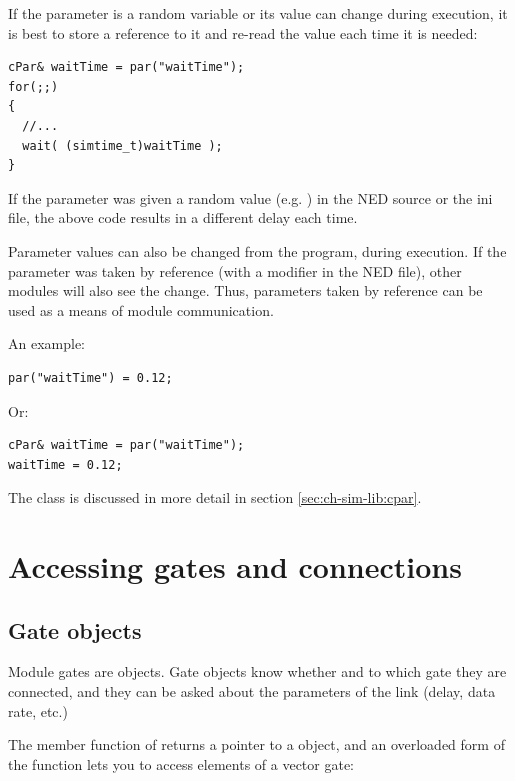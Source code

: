 If the parameter is a random variable or its value can change
during execution, it is best to store a reference to it and re-read
the value each time it is needed:

\begin{verbatim}
cPar& waitTime = par("waitTime");
for(;;)
{
  //...
  wait( (simtime_t)waitTime );
}
\end{verbatim}

If the  parameter was given a random value (e.g. )
in the NED source or the ini file, the above code results in
a different delay each time.

Parameter values can also be changed from the program, during
execution. If the parameter was taken by reference
 (with a
 modifier in the NED file), other modules
will also see the change.  Thus, parameters taken by reference can be
used as a means of module communication.

An example:

\begin{verbatim}
par("waitTime") = 0.12;
\end{verbatim}

Or:

\begin{verbatim}
cPar& waitTime = par("waitTime");
waitTime = 0.12;
\end{verbatim}

The  class is discussed in more detail in section
\ref{sec:ch-sim-lib:cpar}.



\section{Accessing gates and connections}
\label{ch:simple-modules:gates}

\subsection{Gate objects}


Module gates are  objects. Gate objects
know whether and to which gate they are connected, and they can be
asked about the parameters of the link (delay, data rate, etc.)

The  member function of  returns a
pointer to a  object, and an overloaded form of the
function lets you to access elements of a vector gate:

